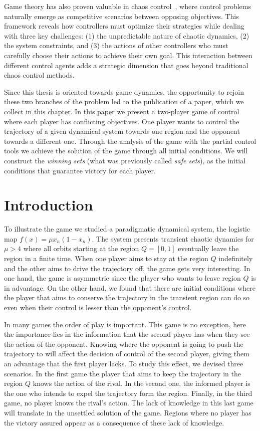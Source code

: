 Game theory has also proven valuable in chaos control~\cite{GamesControl}, where control problems naturally emerge as competitive scenarios between opposing objectives. This framework reveals how controllers must optimize their strategies while dealing with three key challenges: (1) the unpredictable nature of chaotic dynamics, (2) the system constraints, and (3) the actions of other controllers who must carefully choose their actions to achieve their own goal. This interaction between different control agents adds a strategic dimension that goes beyond traditional chaos control methods.

Since this thesis is oriented towards game dynamics, the opportunity to rejoin these two branches of the problem led to the publication of a paper, which we collect in this chapter. In this paper we present a two-player game of control where each player has conflicting objectives. One player wants to control the trajectory of a given dynamical system towards one region and the opponent towards a different one. Through the analysis of the game with the partial control tools we achieve the solution of the game through all initial conditions. We will construct the \textit{winning sets} (what was previously called \textit{safe sets}), as the initial conditions that guarantee victory for each player.

\section{Introduction}

To illustrate the game we studied a paradigmatic dynamical system, the logistic map ${f(x) = \mu x_n(1-x_n)}$. The system presents transient chaotic dynamics for $\mu>4$ where all orbits starting at the region $Q=[0,1]$ eventually leave the region in a finite time. When one player aims to stay at the region $Q$ indefinitely and the other aims to drive the trajectory off, the game gets very interesting. In one hand, the game is asymmetric since the player who wants to leave region $Q$ is in advantage. On the other hand, we found that there are initial conditions where the player that aims to conserve the trajectory in the transient region can do so even when their control is lesser than the opponent's control.

In many games the order of play is important. This game is no exception, here the importance lies in the information that the second player has when they see the action of the opponent. Knowing where the opponent is going to push the trajectory to will affect the decision of control of the second player, giving them an advantage that the first player lacks. To study this effect, we devised three scenarios. In the first game the player that aims to keep the trajectory in the region $Q$ knows the action of the rival. In the second one, the informed player is the one who intends to expel the trajectory form the region. Finally, in the third game, no player knows the rival's action. The lack of knowledge in this last game will translate in the unsettled solution of the game. Regions where no player has the victory assured appear as a consequence of these lack of knowledge.


